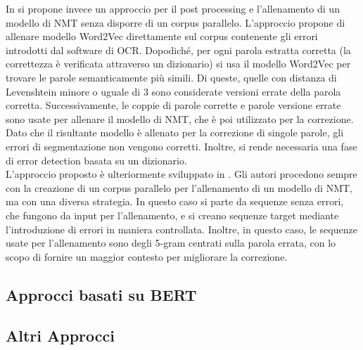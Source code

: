 In \cite{hamalainen2019paft} si propone invece un approccio per il post processing e l'allenamento di un modello di NMT senza disporre di un corpus parallelo. L'approccio propone di allenare modello Word2Vec direttamente sul corpus contenente gli errori introdotti dal software di OCR. Dopodiché, per ogni parola estratta corretta (la correttezza è verificata attraverso un dizionario) si usa il modello Word2Vec per trovare le parole semanticamente più simili. Di queste, quelle con distanza di Levenshtein minore o uguale di 3 sono considerate versioni errate della parola corretta. Successivamente, le coppie di parole corrette e parole versione errate sono usate per allenare il modello di NMT, che è poi utilizzato per la correzione. Dato che il risultante modello è allenato per la correzione di singole parole, gli errori di segmentazione non vengono corretti. Inoltre, si rende necessaria una fase di error detection basata su un dizionario. \\
L'approccio proposto è ulteriormente sviluppato in \cite{duong2020unsupervised}. Gli autori procedono sempre con la creazione di un corpus parallelo per l'allenamento di un modello di NMT, ma con una diversa strategia. In questo caso si parte da sequenze senza errori, che fungono da input per l'allenamento, e si creano sequenze target mediante l'introduzione di errori in maniera controllata. Inoltre, in questo caso, le sequenze usate per l'allenamento sono degli 5-gram centrati sulla parola errata, con lo scopo di fornire un maggior contesto per migliorare la correzione.


\subsection{Approcci basati su BERT}
\label{sec:art_bert}




\subsection{Altri Approcci}
























